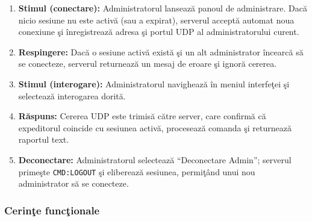 \documentclass[12pt, a4paper]{article}
\begin{document}
\begin{enumerate}
    \item \textbf{Stimul (conectare):} Administratorul lanseaz\u{a} panoul de administrare. Dac\u{a} nicio
    sesiune nu este activ\u{a} (sau a expirat), serverul accept\u{a} automat noua conexiune \c{s}i \^{i}nregistreaz\u{a}
    adresa \c{s}i portul UDP al administratorului curent.
    \item \textbf{Respingere:} Dac\u{a} o sesiune activ\u{a} exist\u{a} \c{s}i un alt administrator \^{i}ncearc\u{a} s\u{a}
    se conecteze, serverul returneaz\u{a} un mesaj de eroare \c{s}i ignor\u{a} cererea.
    \item \textbf{Stimul (interogare):} Administratorul navigheaz\u{a} \^{i}n meniul interfe\c{t}ei \c{s}i selecteaz\u{a}
    interogarea dorit\u{a}.
    \item \textbf{R\u{a}spuns:} Cererea UDP este trimis\u{a} c\u{a}tre server, care confirm\u{a} c\u{a} expeditorul
    coincide cu sesiunea activ\u{a}, proceseaz\u{a} comanda \c{s}i returneaz\u{a} raportul text.
    \item \textbf{Deconectare:} Administratorul selecteaz\u{a} ``Deconectare Admin''; serverul prime\c{s}te
    \texttt{CMD:LOGOUT} \c{s}i elibereaz\u{a} sesiunea, permi\c{t}\^{a}nd unui nou administrator s\u{a} se conecteze.
\end{enumerate}

\subsubsection{Cerin\c{t}e func\c{t}ionale}
\end{document}
